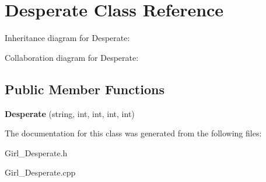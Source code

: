 \hypertarget{classDesperate}{}\section{Desperate Class Reference}
\label{classDesperate}


Inheritance diagram for Desperate\+:


Collaboration diagram for Desperate\+:
\subsection*{Public Member Functions}
\begin{DoxyCompactItemize}
\item 
{\bfseries Desperate} (string, int, int, int, int)\hypertarget{classDesperate_a92f155c7d23783fc076262d320dcbb2c}{}\label{classDesperate_a92f155c7d23783fc076262d320dcbb2c}

\end{DoxyCompactItemize}


The documentation for this class was generated from the following files\+:\begin{DoxyCompactItemize}
\item 
Girl\+\_\+\+Desperate.\+h\item 
Girl\+\_\+\+Desperate.\+cpp\end{DoxyCompactItemize}
